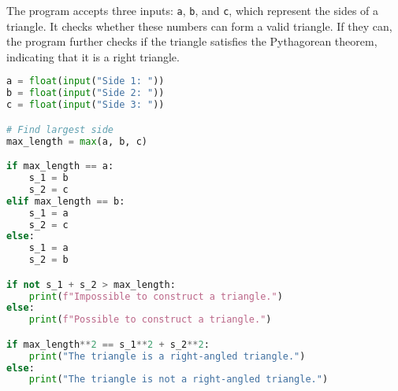 \documentclass[11pt]{article}
\begin{document}
The program accepts three inputs: \texttt{a}, \texttt{b}, and \texttt{c}, 
which represent the sides of a triangle. 
It checks whether these numbers can form a valid triangle. 
If they can, the program further checks if the triangle satisfies 
the Pythagorean theorem, indicating that it is a right triangle.\\

\begin{lstlisting}[language=Python]
a = float(input("Side 1: "))
b = float(input("Side 2: "))
c = float(input("Side 3: "))

# Find largest side
max_length = max(a, b, c)

if max_length == a:
    s_1 = b 
    s_2 = c
elif max_length == b:
    s_1 = a
    s_2 = c
else:
    s_1 = a
    s_2 = b

if not s_1 + s_2 > max_length:
    print(f"Impossible to construct a triangle.")
else:
    print(f"Possible to construct a triangle.")

if max_length**2 == s_1**2 + s_2**2:
    print("The triangle is a right-angled triangle.")
else:
    print("The triangle is not a right-angled triangle.")

\end{lstlisting}
\end{document}
